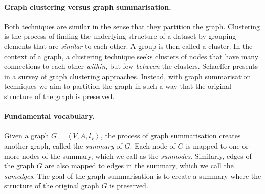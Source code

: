 \paragraph{Graph clustering versus graph summarisation.}

Both techniques are similar in the sense that they partition the graph.
Clustering is the process of finding the underlying structure of a dataset by grouping elements that are \emph{similar} to each other. A group is then called a cluster. In the context of a graph, a clustering technique seeks clusters of nodes that have many connections to each other \emph{within}, but few \emph{between} the clusters. Schaeffer presents in \cite{schaeffer:2007:graph} a survey of graph clustering approaches. Instead, with graph summarisation techniques we aim to partition the graph in such a way that the original structure of the graph is preserved.

\paragraph{Fundamental vocabulary.}

Given a graph $G = \left\langle V, A, l_V \right\rangle$, the process of graph summarisation creates another graph, called the \emph{summary} of $G$. Each node of $G$ is mapped to one or more nodes of the summary, which we call as the \emph{sumnodes}. Similarly, edges of the graph $G$ are also mapped to edges in the summary, which we call the \emph{sumedges}. The goal of the graph summarisation is to create a summary where the structure of the original graph $G$ is preserved.

